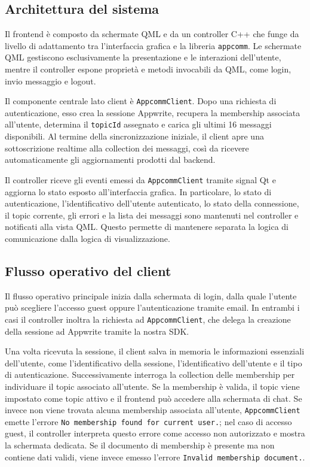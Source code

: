 \documentclass[a4paper, 11pt, twoside]{report}
\begin{document}
\subsection{Architettura del sistema}

Il frontend è composto da schermate QML e da un controller C++ che funge da livello di adattamento tra l'interfaccia grafica e la
libreria \texttt{appcomm}. Le schermate QML gestiscono esclusivamente la presentazione e le interazioni dell'utente, mentre il
controller espone proprietà e metodi invocabili da QML, come login, invio messaggio e logout.

Il componente centrale lato client è \texttt{AppcommClient}. Dopo una richiesta di autenticazione, esso crea la sessione Appwrite, recupera la membership associata all'utente, determina il \texttt{topicId} assegnato e carica gli ultimi 16 messaggi disponibili. Al termine della sincronizzazione iniziale, il client apre una sottoscrizione realtime alla collection dei messaggi, così da ricevere automaticamente gli aggiornamenti prodotti dal backend.

Il controller riceve gli eventi emessi da \texttt{AppcommClient} tramite signal Qt e aggiorna lo stato esposto all'interfaccia grafica. In particolare, lo stato di autenticazione, l'identificativo dell'utente autenticato, lo stato della connessione, il topic corrente, gli errori e la lista dei messaggi sono mantenuti nel controller e notificati alla vista QML. Questo permette di mantenere separata la logica di comunicazione dalla logica di visualizzazione.

\subsection{Flusso operativo del client}

Il flusso operativo principale inizia dalla schermata di login, dalla quale l'utente può scegliere l'accesso guest oppure
l'autenticazione tramite email. In entrambi i casi il controller inoltra la richiesta ad \texttt{AppcommClient}, che delega la
creazione della sessione ad Appwrite tramite la nostra \gls{SDK}.

Una volta ricevuta la sessione, il client salva in memoria le informazioni essenziali dell'utente, come l'identificativo della sessione, l'identificativo dell'utente e il tipo di autenticazione. Successivamente interroga la collection delle membership per individuare il topic associato all'utente. Se la membership è valida, il topic viene impostato come topic attivo e il frontend può accedere alla schermata di chat. Se invece non viene trovata alcuna membership associata all'utente, \texttt{AppcommClient} emette l'errore \texttt{No membership found for current user.}; nel caso di accesso guest, il controller interpreta questo errore come accesso non autorizzato e mostra la schermata dedicata. Se il documento di membership è presente ma non contiene dati validi, viene invece emesso l'errore \texttt{Invalid membership document.}.
\end{document}
